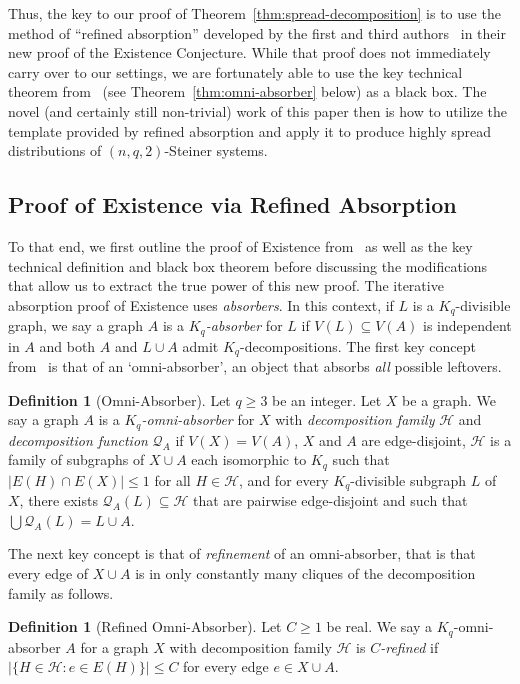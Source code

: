 \documentclass[11pt]{article}
\numberwithin{equation}{section}
\newcounter{i}
\theoremstyle{plain}
\theoremstyle{plain} %
\theoremstyle{definition}
\newtheorem{definition}[thm]{Definition}
\begin{document}
Thus, the key to our proof of Theorem~\ref{thm:spread-decomposition} is to use the method of ``refined absorption'' developed by the first and third authors~\cite{DPI} in their new proof of the Existence Conjecture. While that proof does not immediately carry over to our settings, we are fortunately able to use the key technical theorem from~\cite{DPI} (see Theorem~\ref{thm:omni-absorber} below) as a black box. The novel (and certainly still non-trivial) work of this paper then is how to utilize the template provided by refined absorption and apply it to produce highly spread distributions of $(n,q,2)$-Steiner systems. 

\subsection{Proof of Existence via Refined Absorption}

To that end, we first outline the proof of Existence from~\cite{DPI} as well as the key technical definition and black box theorem before discussing the modifications that allow us to extract the true power of this new proof.
The iterative absorption proof of Existence uses \textit{absorbers}.  In this context, if $L$ is a $K_q$-divisible graph, we say a graph $A$ is a \emph{$K_q$-absorber} for $L$ if $V(L)\subseteq V(A)$ is independent in $A$ and both $A$ and $L\cup A$ admit $K_q$-decompositions.
The first key concept from~\cite{DPI} is that of an `omni-absorber', an object that absorbs \emph{all} possible leftovers.

\begin{definition}[Omni-Absorber]
Let $q \geq 3$ be an integer. Let $X$ be a graph. We say a graph $A$ is a \textit{$K_q$-omni-absorber} for $X$ with \emph{decomposition family} $\mathcal{H}$ and \emph{decomposition function} $\mathcal{Q}_A$ if $V(X)=V(A)$, $X$ and $A$ are edge-disjoint, $\mathcal{H}$ is a family of subgraphs of $X\cup A$ each isomorphic to $K_q$ such that $|E(H)\cap E(X)|\le 1$ for all $H\in\mathcal{H}$, and for every $K_q$-divisible subgraph $L$ of $X$, there exists $\mathcal{Q}_A(L)\subseteq \mathcal{H}$ that are pairwise edge-disjoint and such that $\bigcup \mathcal{Q}_A(L)=L\cup A$. 
\end{definition}

The next key concept is that of \emph{refinement} of an omni-absorber, that is that every edge of $X\cup A$ is in only constantly many cliques of the decomposition family as follows.

\begin{definition}[Refined Omni-Absorber]
Let $C\ge 1$ be real. We say a $K_q$-omni-absorber $A$ for a graph $X$ with decomposition family $\mathcal{H}$ is \emph{$C$-refined} if $|\{H\in \mathcal{H} : e\in E(H) \}| \le C$ for every edge $e\in X\cup A$.
\end{definition}
\end{document}
